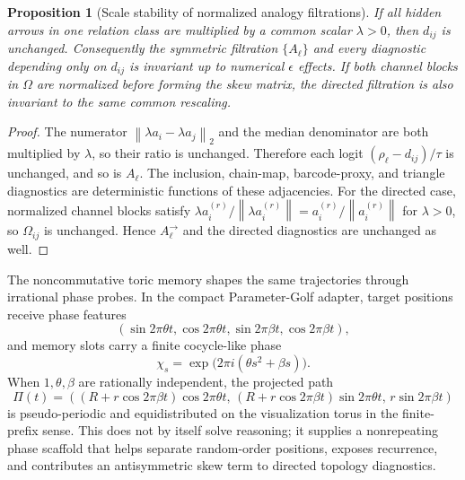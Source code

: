\documentclass[11pt]{article}
\theoremstyle{definition}
\theoremstyle{plain}
\newtheorem{proposition}[definition]{Proposition}
\theoremstyle{remark}
\numberwithin{equation}{section}
\newcommand{\norm}[1]{\left\lVert #1\right\rVert}
\begin{document}
\begin{proposition}[Scale stability of normalized analogy filtrations]
If all hidden arrows in one relation class are multiplied by a common scalar $\lambda>0$, then $d_{ij}$ is unchanged.  Consequently the symmetric filtration $\{A_\ell\}$ and every diagnostic depending only on $d_{ij}$ is invariant up to numerical $\epsilon$ effects.  If both channel blocks in $\Omega$ are normalized before forming the skew matrix, the directed filtration is also invariant to the same common rescaling.
\end{proposition}

\begin{proof}
The numerator $\norm{\lambda a_i-\lambda a_j}_2$ and the median denominator are both multiplied by $\lambda$, so their ratio is unchanged.  Therefore each logit $(\rho_\ell-d_{ij})/\tau$ is unchanged, and so is $A_\ell$.  The inclusion, chain-map, barcode-proxy, and triangle diagnostics are deterministic functions of these adjacencies.  For the directed case, normalized channel blocks satisfy $\lambda a_i^{(r)}/\norm{\lambda a_i^{(r)}}=a_i^{(r)}/\norm{a_i^{(r)}}$ for $\lambda>0$, so $\Omega_{ij}$ is unchanged.  Hence $A_\ell^\rightarrow$ and the directed diagnostics are unchanged as well.
\end{proof}

The noncommutative toric memory shapes the same trajectories through irrational phase probes.  In the compact Parameter-Golf adapter, target positions receive phase features
\begin{equation}
  (\sin 2\pi\theta t,\cos 2\pi\theta t,\sin 2\pi\beta t,\cos 2\pi\beta t),
\end{equation}
and memory slots carry a finite cocycle-like phase
\begin{equation}
  \chi_s=\exp\bigl(2\pi i(\theta s^2+\beta s)\bigr).
\end{equation}
When $1,\theta,\beta$ are rationally independent, the projected path
\begin{equation}
  \Pi(t)=((R+r\cos 2\pi\beta t)\cos 2\pi\theta t,\,
  (R+r\cos 2\pi\beta t)\sin 2\pi\theta t,\,
  r\sin 2\pi\beta t)
\end{equation}
is pseudo-periodic and equidistributed on the visualization torus in the finite-prefix sense.  This does not by itself solve reasoning; it supplies a nonrepeating phase scaffold that helps separate random-order positions, exposes recurrence, and contributes an antisymmetric skew term to directed topology diagnostics.
\end{document}
